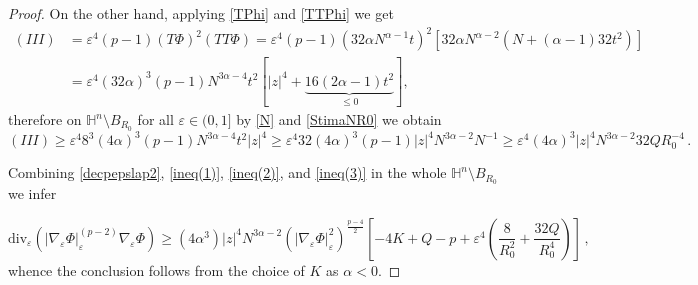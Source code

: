 \documentclass[10pt,a4paper]{amsart}
\newcommand{\He}{\mathbb{H}}
\newcommand{\eps}{\varepsilon}
\begin{document}
\begin{proof}
\noindent On the other hand, applying \eqref{TPhi} and \eqref{TTPhi} we get
\begin{equation}
\label{eq:III}
\begin{aligned}(III) &= \eps^4 (p-1) (T\Phi)^2 (TT\Phi) = \eps^4 (p-1) (32 \alpha N^{\alpha-1}t)^2 \left[32 \alpha N^{\alpha-2} (N+(\alpha-1)32t^2)\right]\\
&= \eps^4 (32 \alpha)^3 (p-1) N^{3\alpha -4} t^2 \left[ |z|^4 + \underbrace{16 (2\alpha -1)t^2}_{\leq 0} \right], 
\end{aligned}
\end{equation}
therefore on $\He^n\setminus B_{R_0}$ for all $\varepsilon \in (0,1]$ by \eqref{N} and \eqref{StimaNR0} we obtain
\begin{equation}
\label{ineq(3)}
(III)\geq \varepsilon^4 8^3 (4\alpha)^3 (p-1) N^{3\alpha-4} t^2 |z|^4\geq \varepsilon^4 32 (4\alpha)^3 (p-1)  |z|^4 N^{3\alpha-2}   N^{-1}\geq  \varepsilon^4 (4\alpha)^3  |z|^4 N^{3\alpha-2} 32 Q   R_0^{-4}\,.
\end{equation}

Combining \eqref{decpepslap2}, \eqref{ineq(1)}, \eqref{ineq(2)}, and \eqref{ineq(3)} in the whole $\He^n\setminus B_{R_0}$ we infer

 \[ \mathrm{div}_{\eps} \left( |\nabla_{\eps} \Phi|_{\eps}^{(p-2)}\nabla_{\eps}\Phi \right) \geq(4\alpha^3) |z|^4 N^{3\alpha-2} \left(|\nabla_{\eps}\Phi|_{\eps}^2 \right)^{\tfrac{p-4}{2}}\left[ -4K+Q-p + \varepsilon^4 \left(\frac{8}{R_0^2} +  \frac{32 Q}{R_0^4} \right) \right] \, ,\]
 whence the conclusion follows from the choice of $K$ as $\alpha<0$.
 \end{proof}
\end{document}
